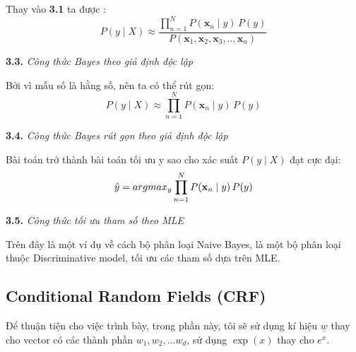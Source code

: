 Thay vào \textbf{3.1} ta được :
$$ P(y \mid X) \approx \frac{\prod_{n=1}^{N} P({\textbf{x}_n} \mid y) \, P(y)} {P({\textbf{x}_1}, {\textbf{x}_2}, {\textbf{x}_3},.., {\textbf{x}_n})} $$
\begin{center}

\vspace{0.3cm}
\textbf{3.3.} \textit{Công thức Bayes theo giả định độc lập}    
\end{center}

Bởi vì mẫu số là hằng số, nên ta có thể rút gọn:
$$ P(y \mid X) \approx \prod_{n=1}^{N} P({\textbf{x}_n} \mid y) \, P(y)$$
\begin{center}

\vspace{0.3cm}
\textbf{3.4.} \textit{Công thức Bayes rút gọn theo giả định độc lập}    
\end{center}
Bài toán trở thành bài toán tối ưu y sao cho xác suất $P(y \mid X)$ đạt cực đại:
$$\Hat{y} = argmax_y \prod_{n=1}^{N} P({\textbf{x}_n} \mid y) \, P(y)$$

\begin{center}

\vspace{0.3cm}
\textbf{3.5.} \textit{Công thức tối ưu tham số theo MLE }    
\end{center}

Trên đây là một ví dụ về cách bộ phân loại Naive Bayes, là một bộ phân loại thuộc Discriminative model, tối ưu các tham số dựa trên MLE.
\subsection{Conditional Random Fields (CRF)}
Để thuận tiện cho việc trình bày, trong phần này, tôi sẽ sử dụng kí hiệu $\underline{w}$ thay cho vector có các thành phần $w_1, w_2,...w_d$, sử dụng $\exp(x)$ thay cho $e^x$. 




